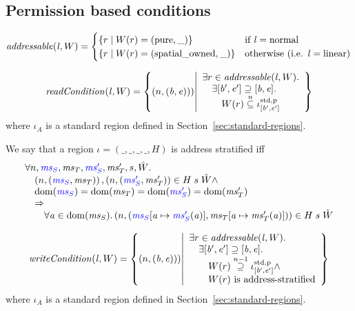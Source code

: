 \documentclass[a3paper]{article}
\newcommand{\dom}{\mathrm{dom}}
\newcommand{\npair}[2][n]{\left(#1,#2\right)}
\newcommand{\nsubeq}[1][n]{\overset{#1}{\subseteq}}
\newcommand{\nsupeq}[1][n]{\overset{#1}{\supseteq}}
\newcommand{\stpair}[3][]{
\ifthenelse{\equal{#1}{}}
{\left(\src{#2_S},#3_T\right)}
{\left(\src{#2},#3\right)}}
\newcommand{\spatialo}{\mathrm{spatial\_owned}}
\newcommand{\pure}{\mathrm{pure}}
\newcommand{\stdreg}[2]{\iota^{\mathrm{std},#2}_{#1}}
\newcommand{\pur}{\mathrm{p}}
\newcommand{\sourcecolor}{\color{blue}}
\newcommand{\src}[1]{{\sourcecolor #1}}
\newcommand{\update}[2]{[#1 \mapsto #2]}
\newcommand{\lin}{\var{l}}
\newcommand{\var}[1]{\mathit{#1}}
\newcommand{\ms}{\var{ms}}
\newcommand{\baddr}{\var{b}}
\newcommand{\eaddr}{\var{e}}
\newcommand{\aaddr}{\var{a}}
\newcommand{\plainlinearity}[1]{\mathrm{#1}}
\newcommand{\linear}{\plainlinearity{linear}}
\newcommand{\normal}{\plainlinearity{normal}}
\newcommand{\plainfun}[2]{
  \ifthenelse{\equal{#2}{}}
  {\mathit{#1}}
  {\mathit{#1}(#2)}
}
\newcommand{\addressable}[1]{\plainfun{addressable}{#1}}
\newcommand{\readCond}[1]{\plainfun{readCondition}{#1}}
\newcommand{\writeCond}[1]{\plainfun{writeCondition}{#1}}
\begin{document}
\subsection{Permission based conditions}
\[
  \addressable{\lin,W} =
  \begin{cases}
    \{ r \mid W(r) = (\pure,\_) \} & \text{if $\lin = \normal$} \\
    \{ r \mid W(r) = (\spatialo,\_) \}  & \text{otherwise (i.e. $\lin = \linear$)} \\
  \end{cases}
\]

\[
  \readCond{\lin,W} = \left\{ \npair{(\baddr,\eaddr})) \middle| 
    \begin{array}{l}
      \exists r \in \addressable{\lin, W} \ldotp \\
      \quad \exists [\baddr',\eaddr'] \supseteq [\baddr,\eaddr] \ldotp \\
      \qquad W(r) \nsubeq \stdreg{[\baddr',\eaddr']}{\pur}
    \end{array}
  \right\}
\]
where $\iota_A$ is a standard region defined in Section~\ref{sec:standard-regions}.

\begin{definition}
  \label{def:address-stratified}
  We say that a region $\iota = (\_,\_,\_,\_,H)$ is address stratified iff
  \[
    \begin{array}{l}
      \forall n, \src{\ms_S},\ms_T,\src{\ms_S'},\ms_T',s,\hat{W}\ldotp \\
      \quad \npair{\stpair{\ms}{\ms}}, \npair{\stpair[.]{\ms_S'}{\ms_T'}} \in H \; s \; \hat{W} \wedge \\
      \quad \dom(\src{\ms_S}) = \dom(\ms_T) = \dom(\src{\ms_S'}) = \dom(\ms_T') \\
      \quad \Rightarrow \\
      \qquad \forall \aaddr \in \dom(\ms_S) \ldotp \npair{(\src{\ms_S}\update{\aaddr}{\src{\ms_S'}(\aaddr)},\ms_T\update{\aaddr}{\ms_T'(\aaddr)})} \in H \; s \; \hat{W}
    \end{array}
  \]
\end{definition}

\[
  \writeCond{\lin,W} = \left\{ \npair{(\baddr,\eaddr)}) \middle| 
    \begin{array}{l}
      \exists r \in \addressable{\lin, W} \ldotp \\
      \quad \exists [\baddr',\eaddr'] \supseteq [\baddr,\eaddr] \ldotp \\
      \qquad W(r) \nsupeq[n-1] \stdreg{[\baddr',\eaddr']}{\pur} \wedge \\
      \qquad W(r) \text{ is address-stratified}
    \end{array}
  \right\}
\]
where $\iota_A$ is a standard region defined in Section~\ref{sec:standard-regions}.
\end{document}
